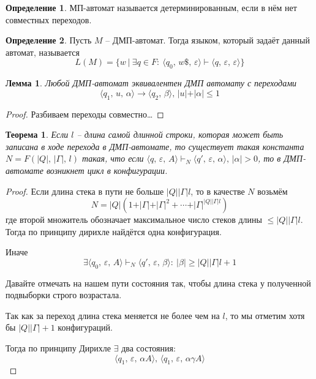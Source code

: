 \documentclass[a4paper,12pt]{article}
\renewcommand{\leq}{\ensuremath{\leqslant}}
\renewcommand{\geq}{\ensuremath{\geqslant}}
\theoremstyle{plain}
\newtheorem{theorem}{Теорема}[subsection]
\newtheorem{lemma}{Лемма}[subsection]
\theoremstyle{definition}
\newtheorem{definition}{Определение}[subsection]
\theoremstyle{remark}
\begin{document}
\begin{definition}
	МП-автомат называется детерминированным, если в нём нет совместных переходов.
\end{definition}

\begin{definition}
	Пусть $M$ -- ДМП-автомат. Тогда языком, который задаёт данный автомат, называется
	\[
		L(M) = \{w \:\vert\: \exists q \in F :\: \langle q_0,\,w\$,\,\varepsilon\rangle\vdash\langle q,\,\varepsilon,\,\varepsilon\rangle\}
	\]
\end{definition}

\begin{lemma}
	Любой ДМП-автомат эквивалентен ДМП автомату с переходами
	\[
		\langle q_1,\,u,\,\alpha\rangle\to\langle q_2,\,\beta\rangle,\, \vert u\vert +\vert \alpha\vert \leq 1
	\]
\end{lemma}

\begin{proof}
	Разбиваем переходы совместно\dots
\end{proof}

\begin{theorem}
	Если $l$ -- длина самой длинной строки, которая может быть записана в ходе перехода в ДМП-автомате, то существует такая константа $N = F(\vert Q\vert,\, \vert \Gamma\vert,\, l)$ такая, что если $\langle q,\,\varepsilon,\, A\rangle \vdash_N\langle q',\,\varepsilon,\, \alpha\rangle,\, \vert \alpha\vert > 0$, то в ДМП-автомате возникнет цикл в конфигурации.
\end{theorem}

\begin{proof}
	Если длина стека в пути не больше $\vert Q\vert\vert\Gamma\vert l$, то в качестве $N$ возьмём
	\[
		N = \vert Q\vert(1 + \vert \Gamma\vert + \vert\Gamma\vert^2 +\cdots + \vert\Gamma\vert^{\vert Q\vert\vert\Gamma\vert l})
	\]
	где второй множитель обозначает максимальное число стеков длины $\leq \vert Q\vert\vert\Gamma\vert l$. Тогда по принципу дирихле найдётся одна конфигурация.

	Иначе
	\[
		\exists \langle q_0,\,\varepsilon,\,A\rangle\vdash_N\langle q',\,\varepsilon,\,\beta\rangle :\: \vert\beta\vert \geq \vert Q\vert\vert\Gamma\vert l + 1
	\]

	Давайте отмечать на нашем пути состояния так, чтобы длина стека у полученной подвыборки строго возрастала.

	Так как за переход длина стека меняется не более чем на $l$, то мы отметим хотя бы $\vert Q\vert\vert\Gamma\vert +1$ конфигураций.

	Тогда по принципу Дирихле $\exists$ два состояния:
	\[
		\langle q_1,\, \varepsilon,\, \alpha A\rangle,\,\langle q_1,\, \varepsilon,\, \alpha\gamma A\rangle
	\]
\end{proof}
\end{document}
